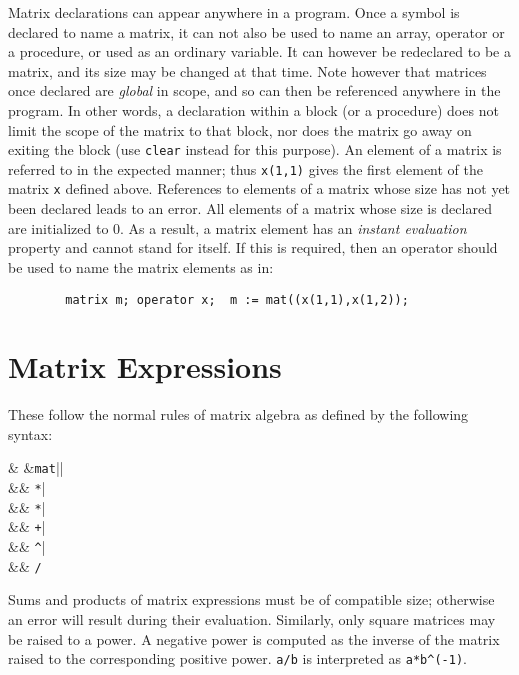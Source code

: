 Matrix declarations can appear anywhere in a program. Once a symbol is
declared to name a matrix, it can not also be used to name an array,
operator or a procedure, or used as an ordinary variable. It can however
be redeclared to be a matrix, and its size may be changed at that time.
Note however that matrices once declared are \emph{global} in scope, and so
can then be referenced anywhere in the program.  In other words, a
declaration within a block (or a procedure) does not limit the scope of
the matrix to that block, nor does the matrix go away on exiting the block
(use \texttt{clear} instead for this purpose).  An element of a matrix is
referred to in the expected manner; thus \texttt{x(1,1)} gives the first
element of the matrix \texttt{x} defined above.  References to elements of a
matrix whose size has not yet been declared leads to an error.  All
elements of a matrix whose size is declared are initialized to 0.  As a
result, a matrix element has an \emph{instant evaluation} property and cannot stand for itself.  If this is required,
then an operator should be used to name the matrix elements as in:
\begin{verbatim}
        matrix m; operator x;  m := mat((x(1,1),x(1,2));
\end{verbatim}

\section{Matrix Expressions}
\label{sec:core-matrix-expressions}

These follow the normal rules of matrix algebra as defined by the
following syntax:
\begin{syntaxtable}
     & \BNFprod &\texttt{mat}|| \\
      &&       \texttt{*}| \\
      &&       \texttt{*}| \\
      &&       \texttt{+}| \\
      &&       \texttt{\textasciicircum}| \\
      &&       \texttt{/}
\end{syntaxtable}
Sums and products of matrix expressions must be of compatible size;
otherwise an error will result during their evaluation.  Similarly, only
square matrices may be raised to a power.  A negative power is computed as
the inverse of the matrix raised to the corresponding positive power.
\texttt{a/b} is interpreted as \texttt{a*b\textasciicircum (-1)}.

